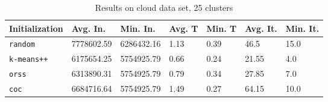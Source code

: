 \begin{table}[h]
	\begin{center}
		\begin{tabular}{|l|l|l|l|l|l|l|}
			\hline
			Initialization & Avg. In. & Min. In. & Avg. T & Min. T & Avg. It. & Min. It.\\\hline
			\texttt{random} & 7778602.59 & 6286432.16 & 1.13 & 0.39 & 46.5 & 15.0\\\hline
			\texttt{k-means++} & 6175654.25 & 5754925.79 & 0.66 & 0.24 & 21.55 & 4.0\\\hline
			\texttt{orss} & 6313890.31 & 5754925.79 & 0.79 & 0.34 & 27.85 & 7.0\\\hline
			\texttt{coc} & 6684716.64 & 5754925.79 & 1.49 & 0.27 & 64.15 & 10.0\\\hline
		\end{tabular}
		\caption{Results on cloud data set, 25 clusters}
		\label{tbl:cloud25}
	\end{center}
\end{table}

